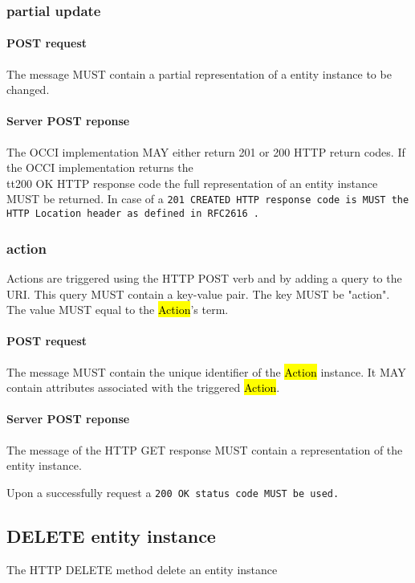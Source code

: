 \documentclass[10pt,a4paper]{article}
\begin{document}
\subsubsection{partial update}

\paragraph{POST request}
The message MUST contain a partial representation of a entity instance to be changed.

\paragraph{Server POST reponse}
The OCCI implementation MAY either return 201 or 200 HTTP return codes. If the OCCI implementation
returns the \\tt{200 OK} HTTP response code the full representation of an entity instance MUST be returned. 
In case of a \tt{201 CREATED} HTTP response code is MUST the HTTP Location header as defined in RFC2616 \cite{?}.

\subsubsection{action}
Actions are triggered using the HTTP POST verb and by adding a query to the URI. This query MUST contain a key-value pair. The key MUST be "action". The value MUST equal to the \hl{Action}'s term.

\paragraph{POST request}
The message MUST contain the unique identifier of the \hl{Action} instance. It MAY contain attributes associated with the triggered \hl{Action}.

\paragraph{Server POST reponse}
The message of the HTTP GET response MUST contain a representation of the entity instance.

Upon a successfully request a \tt{200 OK} status code MUST be used.

\subsection{DELETE entity instance}
The HTTP DELETE method delete an entity instance
\end{document}
